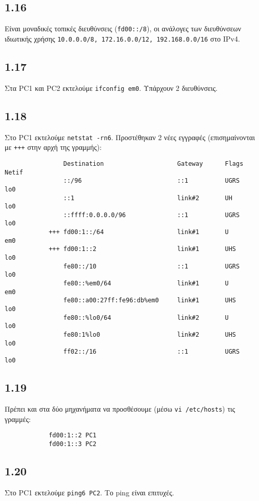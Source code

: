 \documentclass[a4paper, 12pt]{article}
\begin{document}
	\subsection*{1.16}
		Είναι μοναδικές τοπικές διευθύνσεις (\verb|fd00::/8|), οι ανάλογες των διευθύνσεων ιδιωτικής χρήσης \verb|10.0.0.0/8, 172.16.0.0/12, 192.168.0.0/16| στο IPv4.
		
	\subsection*{1.17}
		Στα PC1 και PC2 εκτελούμε \verb|ifconfig em0|. Υπάρχουν 2 διευθύνσεις. 

	\subsection*{1.18}
		Στο PC1 εκτελούμε \verb|netstat -rn6|. Προστέθηκαν 2 νέες εγγραφές (επισημαίνονται με \verb|+++| στην αρχή της γραμμής):
		
		\begin{verbatim}
			    Destination                    Gateway      Flags      Netif
			    ::/96                          ::1          UGRS       lo0 
			    ::1                            link#2       UH         lo0
			    ::ffff:0.0.0.0/96              ::1          UGRS       lo0
			+++ fd00:1::/64                    link#1       U          em0
			+++ fd00:1::2                      link#1       UHS        lo0
			    fe80::/10                      ::1          UGRS       lo0
			    fe80::%em0/64                  link#1       U          em0
			    fe80::a00:27ff:fe96:db%em0     link#1       UHS        lo0
			    fe80::%lo0/64                  link#2       U          lo0
			    fe80:1%lo0                     link#2       UHS        lo0
			    ff02::/16                      ::1          UGRS       lo0
		\end{verbatim}

	\subsection*{1.19}
		Πρέπει και στα δύο μηχανήματα να προσθέσουμε (μέσω \verb|vi /etc/hosts|) τις γραμμές:
		
		\begin{verbatim}
			fd00:1::2 PC1
			fd00:1::3 PC2
		\end{verbatim}

	\subsection*{1.20}
		Στο PC1 εκτελούμε \verb|ping6 PC2|. Το ping είναι επιτυχές.
\end{document}
